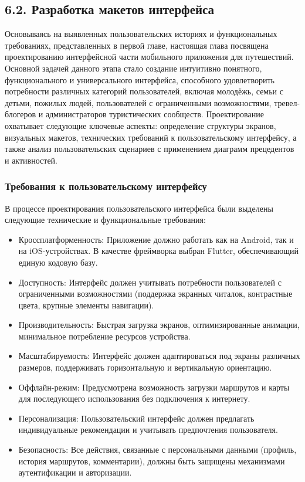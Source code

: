 \subsection*{6.2. Разработка макетов интерфейса}
Основываясь на выявленных пользовательских историях и функциональных требованиях, представленных в первой главе, настоящая глава посвящена проектированию интерфейсной части мобильного приложения для путешествий. Основной задачей данного этапа стало создание интуитивно понятного, функционального и универсального интерфейса, способного удовлетворить потребности различных категорий пользователей, включая молодёжь, семьи с детьми, пожилых людей, пользователей с ограниченными возможностями, тревел-блогеров и администраторов туристических сообществ.
Проектирование охватывает следующие ключевые аспекты: определение структуры экранов, визуальных макетов, технических требований к пользовательскому интерфейсу, а также анализ пользовательских сценариев с применением диаграмм прецедентов и активностей.

\subsubsection*{Требования к пользовательскому интерфейсу}
В процессе проектирования пользовательского интерфейса были выделены следующие технические и функциональные требования:
\begin{itemize}
    \item Кроссплатформенность: Приложение должно работать как на Android, так и на iOS-устройствах. В качестве фреймворка выбран Flutter, обеспечивающий единую кодовую базу.
    \item Доступность: Интерфейс должен учитывать потребности пользователей с ограниченными возможностями (поддержка экранных читалок, контрастные цвета, крупные элементы навигации).
    \item Производительность: Быстрая загрузка экранов, оптимизированные анимации, минимальное потребление ресурсов устройства.
    \item Масштабируемость: Интерфейс должен адаптироваться под экраны различных размеров, поддерживать горизонтальную и вертикальную ориентацию.
    \item Оффлайн-режим: Предусмотрена возможность загрузки маршрутов и карты для последующего использования без подключения к интернету.
    \item Персонализация: Пользовательский интерфейс должен предлагать индивидуальные рекомендации и учитывать предпочтения пользователя.
    \item Безопасность: Все действия, связанные с персональными данными (профиль, история маршрутов, комментарии), должны быть защищены механизмами аутентификации и авторизации.
\end{itemize}

